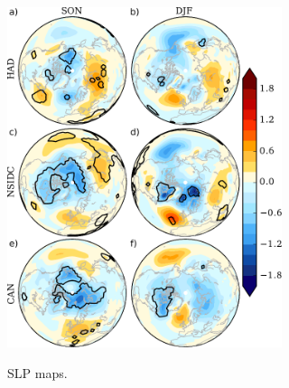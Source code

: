 \documentclass[twocol]{ametsoc}
\begin{document}
\begin{figure}[t]
  \noindent\includegraphics[width=19pc,angle=0]{SLPmaps.pdf}\\
  \caption{SLP maps.
}\label{fig:fig3b}
\end{figure}
\end{document}
